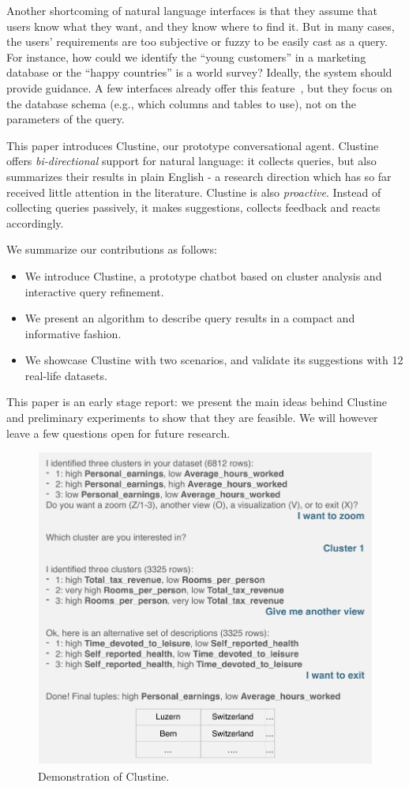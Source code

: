 Another shortcoming of natural language interfaces is that they assume that
users know what they want, and they know where to find it. But in many cases,
the users' requirements are too subjective or fuzzy to be easily cast as a
query. For instance, how could we identify the ``young customers'' in a
marketing database or the ``happy countries'' is a world survey? Ideally, the
system should provide guidance. A few interfaces already offer this
feature~\cite{li2014constructing}, but they focus on the database schema (e.g.,
which columns and tables to use), not on the parameters of the query.

This paper introduces Clustine, our prototype conversational agent. Clustine
offers \emph{bi-directional} support for natural language: it collects queries,
but also summarizes their results in plain English - a research direction which
has so far received little attention in the literature. Clustine is also
\emph{proactive}.  Instead of collecting queries passively, it makes
suggestions, collects feedback and reacts accordingly.

We summarize our contributions as follows:
\begin{itemize}
    \item We introduce Clustine, a prototype chatbot based on cluster analysis
        and interactive query refinement.
    \item We present an algorithm to describe query results in a compact and
        informative fashion.
    \item We showcase Clustine with two scenarios, and validate its suggestions
        with 12 real-life datasets.
\end{itemize}
This paper is an early stage report: we present the main ideas behind Clustine
and preliminary experiments to show that they are feasible.  We will however
leave a few questions open for future research.

\begin{figure}[t]
  \centering
  \includegraphics[width=\columnwidth]{Experiments/UseCaseIntro}
  \caption{Demonstration of Clustine.}
  \label{fig:Overview}
\end{figure}
